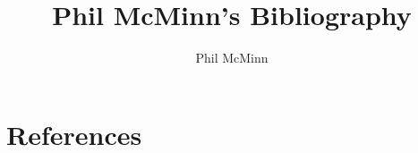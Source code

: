 \documentclass{article}
\begin{document}
\title{Phil McMinn's Bibliography}
\author{Phil McMinn}
\maketitle

\section{References}



\nocite{*}
\end{document}
